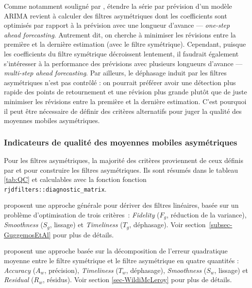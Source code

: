 \documentclass[
  12pt,
  french,
  12pt,a4paper]{article}
\newcommand\1{\mathds{1}}
\begin{document}
Comme notamment souligné par \textcite{wildischis2004}, étendre la série par prévision d'un modèle ARIMA revient à calculer des filtres asymétriques dont les coefficients sont optimisés par rapport à la prévision avec une longueur d'avance --- \emph{one-step ahead forecasting}.
Autrement dit, on cherche à minimiser les révisions entre la première et la dernière estimation (avec le filtre symétrique).
Cependant, puisque les coefficients du filtre symétrique décroissent lentement, il faudrait également s'intéresser à la performance des prévisions avec plusieurs longueurs d'avance --- \emph{multi-step ahead forecasting}.
Par ailleurs, le déphasage induit par les filtres asymétriques n'est pas contrôlé : on pourrait préférer avoir une détection plus rapide des points de retournement et une révision plus grande plutôt que de juste minimiser les révisions entre la première et la dernière estimation.
C'est pourquoi il peut être nécessaire de définir des critères alternatifs pour juger la qualité des moyennes mobiles asymétriques.

\hypertarget{indicateurs-de-qualituxe9-des-moyennes-mobiles-asymuxe9triques}{%
\subsubsection{Indicateurs de qualité des moyennes mobiles asymétriques}\label{indicateurs-de-qualituxe9-des-moyennes-mobiles-asymuxe9triques}}

Pour les filtres asymétriques, la majorité des critères proviennent de ceux définis par \textcite{ch15HBSA} et \textcite{trilemmaWMR2019} pour construire les filtres asymétriques. Ils sont résumés dans le tableau \ref{tab:QC} et calculables avec la fonction fonction \texttt{rjdfilters::diagnostic\_matrix}.

\textcite{ch15HBSA} proposent une approche générale pour dériver des filtres linéaires, basée sur un problème d'optimisation de trois critères~: \emph{Fidelity} (\(F_g\), réduction de la variance), \emph{Smoothness} (\(S_g\), lissage) et \emph{Timeliness} (\(T_g\), déphasage).
Voir section~\ref{subsec-GuggemosEtAl} pour plus de détails.

\textcite{trilemmaWMR2019} proposent une approche basée sur la décomposition de l'erreur quadratique moyenne entre le filtre symétrique et le filtre asymétrique en quatre quantités : \emph{Accuracy} (\(A_w\), précision), \emph{Timeliness} (\(T_w\), déphasage), \emph{Smoothness} (\(S_w\), lissage) et \emph{Residual} (\(R_w\), résidus).
Voir section \ref{sec-WildiMcLeroy} pour plus de détails.
\end{document}
